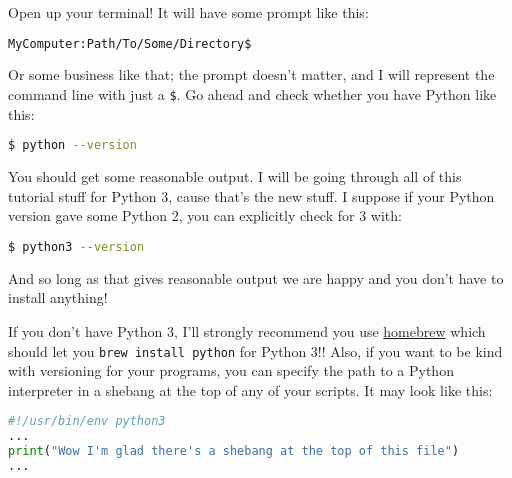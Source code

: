 \documentclass[12pt, twoside, reqno]{book}
\begin{document}
\label{A quick aside for setting up your environment:}
\vspace{10px}
\noindent{}
\vspace{10px}


\label{Back to business:}

Open up your terminal! It will have some prompt like this:
\begin{lstlisting}[language=sh]
MyComputer:Path/To/Some/Directory$
\end{lstlisting}

Or some business like that; the prompt doesn't matter, and I will represent the command line with just a \texttt{\$}. Go ahead and check whether you have Python like this:
\begin{lstlisting}[language=sh]
$ python --version
\end{lstlisting}

You should get some reasonable output. I will be going through all of this tutorial stuff for Python 3, cause that's the new stuff. I suppose if your Python version gave some Python 2, you can explicitly check for 3 with:
\begin{lstlisting}[language=sh]
$ python3 --version
\end{lstlisting}

And so long as that gives reasonable output we are happy and you don't have to install anything!

If you don't have Python 3, I'll strongly recommend you use \href{https://brew.sh/}{homebrew} which should let you \texttt{brew install python} for Python 3!! Also, if you want to be kind with versioning for your programs, you can specify the path to a Python interpreter in a shebang at the top of any of your scripts. It may look like this:
\begin{lstlisting}[language=Python]
#!/usr/bin/env python3
...
print("Wow I'm glad there's a shebang at the top of this file")
...
\end{lstlisting}
\end{document}
